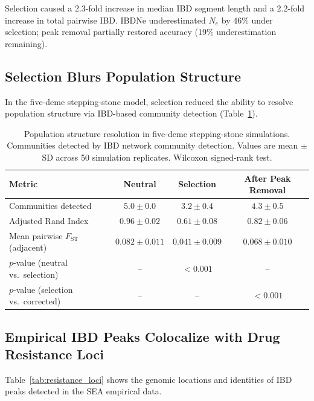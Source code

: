 \documentclass[11pt]{article}
\begin{document}
Selection caused a 2.3-fold increase in median IBD segment length and a 2.2-fold increase in total pairwise IBD. IBDNe underestimated $N_e$ by 46\% under selection; peak removal partially restored accuracy (19\% underestimation remaining).

\subsection{Selection Blurs Population Structure}

In the five-deme stepping-stone model, selection reduced the ability to resolve population structure via IBD-based community detection (Table~\ref{tab:sim_structure}).

\begin{table}[H]
\centering
\caption{Population structure resolution in five-deme stepping-stone simulations. Communities detected by IBD network community detection. Values are mean $\pm$ SD across 50 simulation replicates. Wilcoxon signed-rank test.}
\label{tab:sim_structure}
\begin{tabular}{lccc}
\toprule
Metric & Neutral & Selection & After Peak Removal \\
\midrule
Communities detected & $\mathbf{5.0 \pm 0.0}$ & $3.2 \pm 0.4$ & $4.3 \pm 0.5$ \\
Adjusted Rand Index & $\mathbf{0.96 \pm 0.02}$ & $0.61 \pm 0.08$ & $0.82 \pm 0.06$ \\
Mean pairwise $F_{\text{ST}}$ (adjacent) & $\mathbf{0.082 \pm 0.011}$ & $0.041 \pm 0.009$ & $0.068 \pm 0.010$ \\
$p$-value (neutral vs.\ selection) & -- & $< 0.001$ & -- \\
$p$-value (selection vs.\ corrected) & -- & -- & $< 0.001$ \\
\bottomrule
\end{tabular}
\end{table}

\subsection{Empirical IBD Peaks Colocalize with Drug Resistance Loci}

Table~\ref{tab:resistance_loci} shows the genomic locations and identities of IBD peaks detected in the SEA empirical data.
\end{document}
